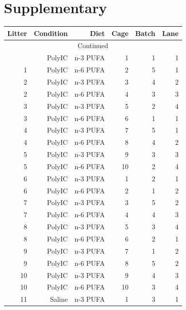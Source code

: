 \section{Supplementary}
\begin{center}
	\begin{longtable}[H]{rrrrrr}
			\toprule
			Litter & Condition & Diet  & Cage  & Batch & Lane \\
			\midrule
			\endhead
			\hline
			\multicolumn{6}{c}{Continued}\\
			\bottomrule
			\endfoot
			\bottomrule
			\endlastfoot
			    1     & PolyIC & n-3 PUFA & 1     & 1     & 1 \\
			    1     & PolyIC & n-6 PUFA & 2     & 5     & 1 \\
			    2     & PolyIC & n-3 PUFA & 3     & 4     & 2 \\
			    2     & PolyIC & n-6 PUFA & 4     & 3     & 3 \\
			    3     & PolyIC & n-3 PUFA & 5     & 2     & 4 \\
			    3     & PolyIC & n-6 PUFA & 6     & 1     & 1 \\
			    4     & PolyIC & n-3 PUFA & 7     & 5     & 1 \\
			    4     & PolyIC & n-6 PUFA & 8     & 4     & 2 \\
			    5     & PolyIC & n-3 PUFA & 9     & 3     & 3 \\
			    5     & PolyIC & n-6 PUFA & 10    & 2     & 4 \\
			    6     & PolyIC & n-3 PUFA & 1     & 2     & 1 \\
			    6     & PolyIC & n-6 PUFA & 2     & 1     & 2 \\
			    7     & PolyIC & n-3 PUFA & 3     & 5     & 2 \\
			    7     & PolyIC & n-6 PUFA & 4     & 4     & 3 \\
			    8     & PolyIC & n-3 PUFA & 5     & 3     & 4 \\
			    8     & PolyIC & n-6 PUFA & 6     & 2     & 1 \\
			    9     & PolyIC & n-3 PUFA & 7     & 1     & 2 \\
			    9     & PolyIC & n-6 PUFA & 8     & 5     & 2 \\
			    10    & PolyIC & n-3 PUFA & 9     & 4     & 3 \\
			    10    & PolyIC & n-6 PUFA & 10    & 3     & 4 \\
			    11    & Saline & n-3 PUFA & 1     & 3     & 1 \\

\end{longtable}
\end{center}
